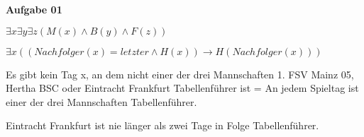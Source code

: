 \documentclass[a4paper,10pt]{article}
\begin{document}
	\parindent0pt
	\textbf{Aufgabe 01}
	\begin{compactenum} [(a)]
		\item \begin{compactenum} [(i)]
			\item $ \exists x \exists y \exists z (M(x) \wedge B(y) \wedge F(z)) $
			\item $ \exists x ((Nachfolger(x) = letzter \wedge H(x))\rightarrow H(Nachfolger(x))) $
		\end{compactenum}
		\item \begin{compactenum} [(i)]
			\item Es gibt kein Tag x,  an dem nicht einer der drei Mannschaften 1. FSV Mainz 05, Hertha BSC oder Eintracht Frankfurt Tabellenführer ist = An jedem Spieltag ist einer der drei Mannschaften Tabellenführer.
			\item Eintracht Frankfurt ist nie länger als zwei Tage in Folge Tabellenführer.
		\end{compactenum}
	\end{compactenum}
\end{document}
